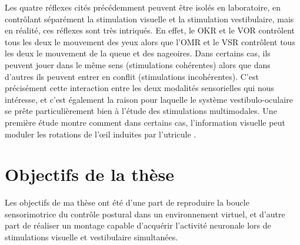 Les quatre réflexes cités précédemment peuvent être isolés en laboratoire, en contrôlant séparément la stimulation visuelle et la stimulation vestibulaire, mais en réalité, ces réflexes sont très intriqués. En effet, le OKR et le VOR contrôlent tous les deux le mouvement des yeux alors que l'OMR et le VSR contrôlent tous les deux le mouvement de la queue et des nageoires. Dans certains cas, ils peuvent jouer dans le même sens (stimulations cohérentes) alors que dans d'autres ils peuvent entrer en conflit (stimulations incohérentes). C'est précisément cette interaction entre les deux modalités sensorielles qui nous intéresse, et c'est également la raison pour laquelle le système vestibulo-oculaire se prête particulièrement bien à l'étude des stimulations multimodales. Une première étude montre comment dans certains cas, l'information visuelle peut moduler les rotations de l'œil induites par l'utricule \cite{bianco_tangential_2012}.


\section{Objectifs de la thèse}


Les objectifs de ma thèse ont été d'une part de reproduire la boucle sensorimotrice du contrôle postural dans un environnement virtuel, et d'autre part de réaliser un montage capable d'acquérir l'activité neuronale lors de stimulations visuelle et vestibulaire simultanées.